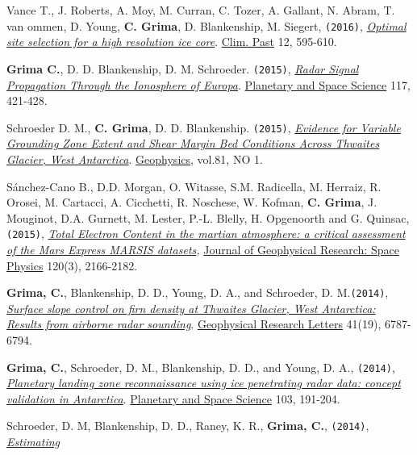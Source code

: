 \begin{etaremune}
\item
  Vance T., J. Roberts, A. Moy, M. Curran, C. Tozer, A. Gallant, N.
  Abram, T. van ommen, D. Young, \textbf{C. Grima}, D. Blankenship, M.
  Siegert, \texttt{(2016)},
  \href{http://www.clim-past.net/12/595/2016/cp-12-595-2016.pdf}{\emph{Optimal
  site selection for a high resolution ice core}}. \ul{Clim. Past} 12,
  595-610.
\item
  \textbf{Grima C.}, D. D. Blankenship, D. M. Schroeder. \texttt{(2015)},
  \emph{\href{http://www.sciencedirect.com/science/article/pii/S0032063315002470}{Radar
  Signal Propagation Through the Ionosphere of Europa}}. \ul{Planetary and
  Space Science} 117, 421-428.
\item
  Schroeder D. M., \textbf{C. Grima}, D. D. Blankenship. \texttt{(2015)},
  \emph{\href{http://library.seg.org/doi/abs/10.1190/geo2015-0122.1}{Evidence
  for Variable Grounding Zone Extent and Shear Margin Bed Conditions
  Across Thwaites Glacier, West Antarctica}}. \ul{Geophysics}, vol.81, NO 1.
\item
  Sánchez-Cano B., D.D. Morgan, O. Witasse, S.M. Radicella, M. Herraiz,
  R. Orosei, M. Cartacci, A. Cicchetti, R. Noschese, W. Kofman,
  \textbf{C. Grima}, J. Mouginot, D.A. Gurnett, M. Lester, P.-L. Blelly,
  H. Opgenoorth and G. Quinsac, \texttt{(2015)},
  \emph{\href{http://onlinelibrary.wiley.com/doi/10.1002/2014JA020630/abstract}{Total
  Electron Content in the martian atmosphere: a critical assessment of
  the Mars Express MARSIS datasets},} \ul{Journal of Geophysical Research:
  Space Physics} 120(3), 2166-2182.
\item
  \textbf{Grima, C.}, Blankenship, D. D., Young, D. A., and Schroeder,
  D. M.\texttt{(2014)},
  \href{http://onlinelibrary.wiley.com/enhanced/doi/10.1002/2014GL061635/}{\emph{Surface
  slope control on firn density at Thwaites Glacier, West Antarctica:
  Results from airborne radar sounding}}. \ul{Geophysical Research Letters}
  41(19), 6787-6794.
\item
  \textbf{Grima, C.}, Schroeder, D. M., Blankenship, D. D., and Young,
  D. A., \texttt{(2014)},
  \href{http://www.sciencedirect.com/science/article/pii/S0032063314002244}{\emph{Planetary
  landing zone reconnaissance using ice penetrating radar data: concept
  validation in Antarctica}}. \ul{Planetary and Space Science} 103, 191-204.
\item
  Schroeder, D. M, Blankenship, D. D., Raney, K. R., \textbf{Grima, C.},
  \texttt{(2014)},
  \href{http://ieeexplore.ieee.org/xpl/login.jsp?tp=\&arnumber=6901268\&url=http\%3A\%2F\%2Fieeexplore.ieee.org\%2Fstamp\%2Fstamp.jsp\%3Ftp\%3D\%26arnumber\%3D6901268}{\emph{Estimating
}}
\end{etaremune}
